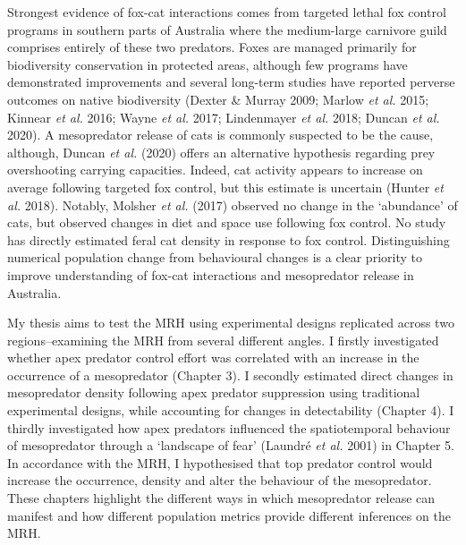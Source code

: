 \documentclass[11pt,a4paper,titlepage,twoside,openright]{style/unimelbthesis}
\begin{document}
\begin{mainmatter}
Strongest evidence of fox-cat interactions comes from targeted lethal fox control programs in southern parts of Australia where the medium-large carnivore guild comprises entirely of these two predators. Foxes are managed primarily for biodiversity conservation in protected areas, although few programs have demonstrated improvements and several long-term studies have reported perverse outcomes on native biodiversity (Dexter \& Murray 2009; Marlow \emph{et al.} 2015; Kinnear \emph{et al.} 2016; Wayne \emph{et al.} 2017; Lindenmayer \emph{et al.} 2018; Duncan \emph{et al.} 2020). A mesopredator release of cats is commonly suspected to be the cause, although, Duncan \emph{et al.} (2020) offers an alternative hypothesis regarding prey overshooting carrying capacities. Indeed, cat activity appears to increase on average following targeted fox control, but this estimate is uncertain (Hunter \emph{et al.} 2018). Notably, Molsher \emph{et al.} (2017) observed no change in the `abundance' of cats, but observed changes in diet and space use following fox control. No study has directly estimated feral cat density in response to fox control. Distinguishing numerical population change from behavioural changes is a clear priority to improve understanding of fox-cat interactions and mesopredator release in Australia.

My thesis aims to test the MRH using experimental designs replicated across two regions--examining the MRH from several different angles. I firstly investigated whether apex predator control effort was correlated with an increase in the occurrence of a mesopredator (Chapter 3). I secondly estimated direct changes in mesopredator density following apex predator suppression using traditional experimental designs, while accounting for changes in detectability (Chapter 4). I thirdly investigated how apex predators influenced the spatiotemporal behaviour of mesopredator through a `landscape of fear' (Laundré \emph{et al.} 2001) in Chapter 5. In accordance with the MRH, I hypothesised that top predator control would increase the occurrence, density and alter the behaviour of the mesopredator. These chapters highlight the different ways in which mesopredator release can manifest and how different population metrics provide different inferences on the MRH.


\end{mainmatter}
\end{document}
